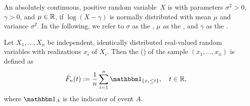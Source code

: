 \begin{definition}
	An absolutely continuous, positive random variable~$X$ is  with parameters 
	$\sigma^2 > 0$, $\gamma > 0$, and $\mu \in \mathbb{R}$, 
	if $\log(X - \gamma)$ is normally distributed with mean $\mu$ and variance $\sigma^2$. In the following, we refer to $\sigma$ as the , $\mu$ as the , and $\gamma$ as the .
\end{definition}


\begin{definition}
	Let $X_1, \dots, X_n$ be independent, identically distributed real-valued random variables
	with realizations $x_i$ of $X_i$.
	Then the  () of the sample $(x_1, \dots, x_n)$ is defined as
		\[
		\hat{F}_n(t) := \frac{1}{n} \sum_{i=1}^n \Indikator{\set{x_i \leq t}}, \quad t \in \R,
		\]	
	where $\Indikator{A}$ is the indicator of event $A$.
\end{definition}












